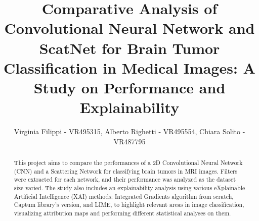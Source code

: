 \documentclass[11pt]{article}
\title{Comparative Analysis of Convolutional Neural Network and ScatNet for Brain Tumor Classification in Medical Images: A Study on Performance and Explainability}
\author{Virginia Filippi - VR495315, Alberto Righetti - VR495554, Chiara Solito - VR487795}
\date{}
\begin{document}
\maketitle

\begin{abstract}
This project aims to compare the performances of a 2D Convolutional Neural Network (CNN) and a Scattering Network for classifying brain tumors in MRI images. Filters were extracted for each network, and their performance was analyzed as the dataset size varied. The study also includes an explainability analysis using various eXplainable Artificial Intelligence (XAI) methods: Integrated Gradients algorithm from scratch, Captum library's version, and LIME, to highlight relevant areas in image classification, visualizing attribution maps and performing different statistical analyses on them.
\end{abstract}
\end{document}
